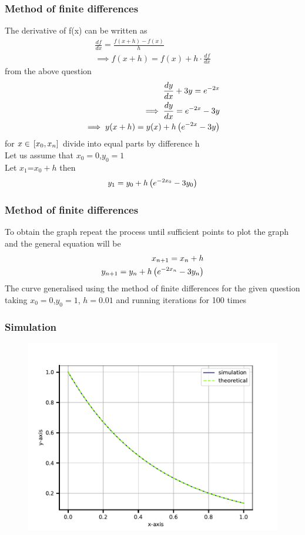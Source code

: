 \documentclass{beamer}
\begin{document}
\begin{frame}[fragile]
\frametitle{Method of finite differences}
The derivative of f(x) can be written as 
\begin{align}
    \frac{df}{dx}=\frac{f(x+h)-f(x)}{h}\\
    \implies f(x+h)=f(x)+h\cdot\frac{df}{dx}
\end{align}
from the above question 
\begin{align}
    \frac{dy}{dx}+3y=e^{-2x}\\
    \implies \frac{dy}{dx}=e^{-2x}-3y\\
    \implies y(x+h)=y(x)+h\left(e^{-2x}-3y\right)
\end{align}
for $x \in {}\left[x_{0},x_{n}\right]$ divide into equal parts by difference h\\
Let us assume that $x_{0}=0$,$y_{0}=1$\\
Let $x_{1}$=$x_{0}+h$ then
\begin{align}
    y_{1}=y_{0}+h\left(e^{-2x_{0}}-3y_{0}\right)
\end{align}
\end{frame}
\begin{frame}[fragile]
\frametitle{Method of finite differences}
To obtain the graph repeat the process until sufficient points to plot the graph and the general equation will be 
\begin{align}
    x_{n+1}=x_{n}+h\\
    y_{n+1}=y_{n}+h\left(e^{-2x_{n}}-3y_{n}\right)
\end{align}
The curve generalised using the method of finite differences for the given question taking $x_{0}=0$,$y_{0}=1$, $h=0.01$ and running iterations for 100 times
\end{frame}
\begin{frame}
\frametitle{Simulation}
\begin{figure}
    \centering
    \centering
   \includegraphics[width=0.7\columnwidth]{fig.pdf}
    \caption{}
    \label{fig:enter-label}
\end{figure}
\end{frame}
\end{document}
